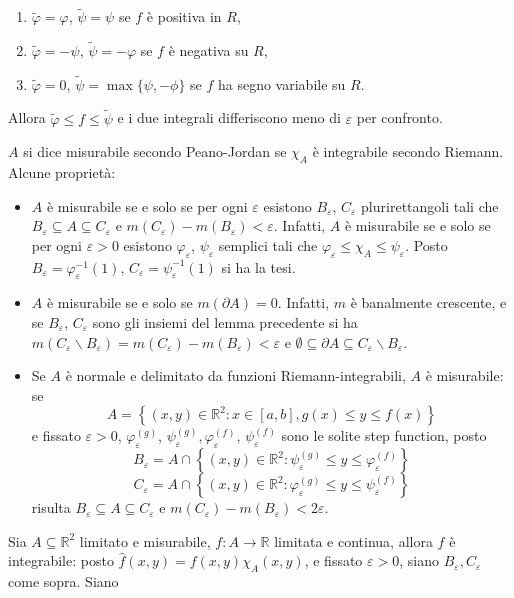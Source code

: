 \documentclass[a4paper,11pt]{article}
\begin{document}
\begin{enumerate}
\begin{itemize}
		\begin{enumerate}
			\item $\tilde\varphi=\varphi$, $\tilde{\psi}=\psi$ se $f$ è positiva in $R$,
			\item $\tilde{\varphi}=-\psi$, $\tilde{\psi}=-\varphi$ se $f$ è negativa su $R$,
			\item $\tilde{\varphi}=0$, $\tilde{\psi}=\max\{\psi,-\phi\}$ se $f$ ha segno variabile su $R$.
		\end{enumerate}
		Allora $\tilde{\varphi}\leq f\leq\tilde{\psi}$ e i due integrali differiscono meno di $\varepsilon$ per confronto.
	\end{itemize}
	$A$ si dice misurabile secondo Peano-Jordan se $\chi_A$ è integrabile secondo Riemann. 
	Alcune proprietà:
	\begin{itemize}
		\item $A$ è misurabile se e solo se per ogni $\varepsilon$ esistono $B_\varepsilon$, $C_\varepsilon$ plurirettangoli tali che $B_\varepsilon\subseteq A\subseteq C_\varepsilon$ e $m(C_\varepsilon)-m(B_\varepsilon)<\varepsilon$. Infatti, $A$ è misurabile se e solo se per ogni $\varepsilon>0$ esistono $\varphi_\varepsilon$, $\psi_\varepsilon$ semplici tali che $\varphi_\varepsilon\leq \chi_A\leq\psi_\varepsilon$. Posto $B_\varepsilon=\varphi_\varepsilon^{-1}(1)$, $C_\varepsilon=\psi_\varepsilon^{-1}(1)$ si ha la tesi.
		\item $A$ è misurabile se e solo se $m(\partial A)=0$. Infatti, $m$ è banalmente crescente, e se $B_\varepsilon$, $C_\varepsilon$ sono gli insiemi del lemma precedente si ha $m(C_\varepsilon\backslash B_\varepsilon)=m(C_\varepsilon)-m(B_\varepsilon)<\varepsilon$ e $\emptyset\subseteq\partial A\subseteq C_\varepsilon\backslash B_\varepsilon$.
		\item Se $A$ è normale e delimitato da funzioni Riemann-integrabili, $A$ è misurabile: se 
		\[A=\left\{(x,y)\in\mathbb{R}^2:x\in[a,b], g(x)\leq y\leq f(x)\right\}\]
		e fissato $\varepsilon>0$, $\varphi_\varepsilon^{(g)}$, $\psi_\varepsilon^{(g)},\varphi_\varepsilon^{(f)}$, $\psi_\varepsilon^{(f)}$ sono le solite step function, posto
		\[B_\varepsilon=A\cap\left\{(x,y)\in\mathbb{R}^2:\psi_\varepsilon^{(g)}\leq y\leq \varphi_\varepsilon^{(f)}\right\}\]
		\[C_\varepsilon=A\cap\left\{(x,y)\in\mathbb{R}^2:\varphi_\varepsilon^{(g)}\leq y\leq \psi_\varepsilon^{(f)}\right\}\]
		risulta $B_\varepsilon\subseteq A\subseteq C_\varepsilon$ e $m(C_\varepsilon)-m(B_\varepsilon)<2\varepsilon$.
	\end{itemize}
	Sia $A\subseteq\mathbb{R}^2$ limitato e misurabile, $f\colon A\to\mathbb{R}$ limitata e continua, allora $f$ è integrabile: posto $\hat{f}(x,y)=f(x,y)\chi_A(x,y)$, e fissato $\varepsilon>0$, siano $B_\varepsilon,C_\varepsilon$ come sopra. Siano 

\end{enumerate}
\end{document}
